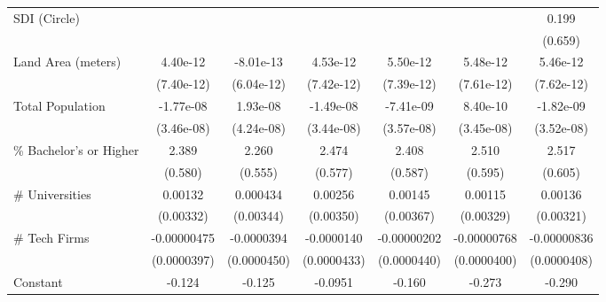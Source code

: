 {\begin{tabular}{l*{6}{c}}
SDI (Circle)        &                     &                     &                     &                     &                     &       0.199         \\
                    &                     &                     &                     &                     &                     &     (0.659)         \\
\addlinespace
Land Area (meters)  &    4.40e-12         &   -8.01e-13         &    4.53e-12         &    5.50e-12         &    5.48e-12         &    5.46e-12         \\
                    &  (7.40e-12)         &  (6.04e-12)         &  (7.42e-12)         &  (7.39e-12)         &  (7.61e-12)         &  (7.62e-12)         \\
\addlinespace
Total Population    &   -1.77e-08         &    1.93e-08         &   -1.49e-08         &   -7.41e-09         &    8.40e-10         &   -1.82e-09         \\
                    &  (3.46e-08)         &  (4.24e-08)         &  (3.44e-08)         &  (3.57e-08)         &  (3.45e-08)         &  (3.52e-08)         \\
\addlinespace
\% Bachelor's or Higher&       2.389\sym{***}&       2.260\sym{***}&       2.474\sym{***}&       2.408\sym{***}&       2.510\sym{***}&       2.517\sym{***}\\
                    &     (0.580)         &     (0.555)         &     (0.577)         &     (0.587)         &     (0.595)         &     (0.605)         \\
\addlinespace
\# Universities     &     0.00132         &    0.000434         &     0.00256         &     0.00145         &     0.00115         &     0.00136         \\
                    &   (0.00332)         &   (0.00344)         &   (0.00350)         &   (0.00367)         &   (0.00329)         &   (0.00321)         \\
\addlinespace
\# Tech Firms       & -0.00000475         &  -0.0000394         &  -0.0000140         & -0.00000202         & -0.00000768         & -0.00000836         \\
                    & (0.0000397)         & (0.0000450)         & (0.0000433)         & (0.0000440)         & (0.0000400)         & (0.0000408)         \\
\addlinespace
Constant            &      -0.124         &      -0.125         &     -0.0951         &      -0.160         &      -0.273         &      -0.290         \\

\end{tabular}}
